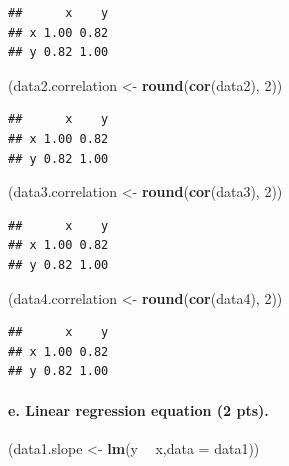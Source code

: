 \documentclass[]{article}
\newenvironment{Shaded}{\begin{snugshade}}{\end{snugshade}}
\newcommand{\KeywordTok}[1]{\textcolor[rgb]{0.13,0.29,0.53}{\textbf{#1}}}
\newcommand{\DataTypeTok}[1]{\textcolor[rgb]{0.13,0.29,0.53}{#1}}
\newcommand{\DecValTok}[1]{\textcolor[rgb]{0.00,0.00,0.81}{#1}}
\newcommand{\StringTok}[1]{\textcolor[rgb]{0.31,0.60,0.02}{#1}}
\newcommand{\OperatorTok}[1]{\textcolor[rgb]{0.81,0.36,0.00}{\textbf{#1}}}
\newcommand{\NormalTok}[1]{#1}
\let\oldparagraph\paragraph
\renewcommand{\paragraph}[1]{\oldparagraph{#1}\mbox{}}
\begin{document}
\begin{verbatim}
##      x    y
## x 1.00 0.82
## y 0.82 1.00
\end{verbatim}

\begin{Shaded}
\begin{Highlighting}[]
\NormalTok{(data2.correlation <-}\StringTok{ }\KeywordTok{round}\NormalTok{(}\KeywordTok{cor}\NormalTok{(data2), }\DecValTok{2}\NormalTok{))}
\end{Highlighting}
\end{Shaded}

\begin{verbatim}
##      x    y
## x 1.00 0.82
## y 0.82 1.00
\end{verbatim}

\begin{Shaded}
\begin{Highlighting}[]
\NormalTok{(data3.correlation <-}\StringTok{ }\KeywordTok{round}\NormalTok{(}\KeywordTok{cor}\NormalTok{(data3), }\DecValTok{2}\NormalTok{))}
\end{Highlighting}
\end{Shaded}

\begin{verbatim}
##      x    y
## x 1.00 0.82
## y 0.82 1.00
\end{verbatim}

\begin{Shaded}
\begin{Highlighting}[]
\NormalTok{(data4.correlation <-}\StringTok{ }\KeywordTok{round}\NormalTok{(}\KeywordTok{cor}\NormalTok{(data4), }\DecValTok{2}\NormalTok{))}
\end{Highlighting}
\end{Shaded}

\begin{verbatim}
##      x    y
## x 1.00 0.82
## y 0.82 1.00
\end{verbatim}

\paragraph{e. Linear regression equation (2
pts).}\label{e.-linear-regression-equation-2-pts.}

\begin{Shaded}
\begin{Highlighting}[]
\NormalTok{(data1.slope <-}\StringTok{ }\KeywordTok{lm}\NormalTok{(y }\OperatorTok{~}\StringTok{ }\NormalTok{x,}\DataTypeTok{data =}\NormalTok{ data1))}
\end{Highlighting}
\end{Shaded}
\end{document}
